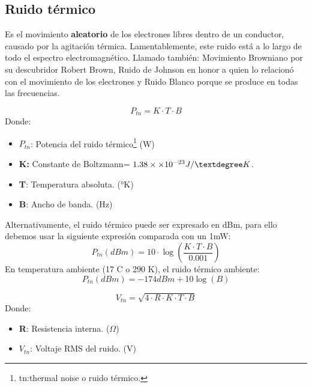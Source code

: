 \documentclass[
	12pt, %
	fleqn, %
	a4paper, %
	oneside, %
]{LegrandOrangeBook}
\begin{document}
\subsection{Ruido térmico}
Es el movimiento \textbf{aleatorio} de los electrones libres dentro de un conductor, causado por la agitación térmica. Lamentablemente, este ruido está a lo largo de todo el espectro electromagnético.
Llamado también: Movimiento Browniano por su descubridor Robert Brown, Ruido de Johnson en honor a quien lo relacionó con el movimiento de los electrones y Ruido Blanco porque se produce en todas las frecuencias.
\begin{definition}
\begin{equation}
P_{tn}=K\cdot T\cdot B
\label{eq:ruido termico}
\end{equation}
Donde:
\begin{itemize}
\item $P_{tn}$: Potencia del ruido  térmico\footnote{tn:thermal noise o ruido térmico.} (W)
\item \textbf{K:} Constante de Boltzmann= $1.38\times\basedec{-23} J/°K$.
\item \textbf{T}: Temperatura absoluta. (°K)
\item \textbf{B}: Ancho de banda. (Hz)
\end{itemize}
Alternativamente, el ruido térmico puede ser expresado en dBm, para ello debemos usar la siguiente expresión comparada con un 1mW:
\begin{equation}
P_{tn}(dBm)=10\cdot\log\left(\frac{K\cdot T\cdot B}{0.001}\right)
\label{eq:ruido termico log}
\end{equation}
En temperatura ambiente (17 C o 290 K), el ruido térmico ambiente:
\begin{equation}
P_{tn}(dBm)=-174 dBm+10\log(B)
\label{eq:ruido termico ambiente}
\end{equation}
\end{definition}
\begin{definition}
\begin{equation}
V_{tn}=\sqrt{4\cdot R\cdot K\cdot T\cdot B}
\label{eq:voltaje ruido termico}
\end{equation}
Donde:
\begin{itemize}
\item \textbf{R}: Resistencia interna. ($\Omega$)
\item \textbf{$V_{tn}$}: Voltaje RMS del ruido. (V)
\end{itemize}
\end{definition}
\end{document}
